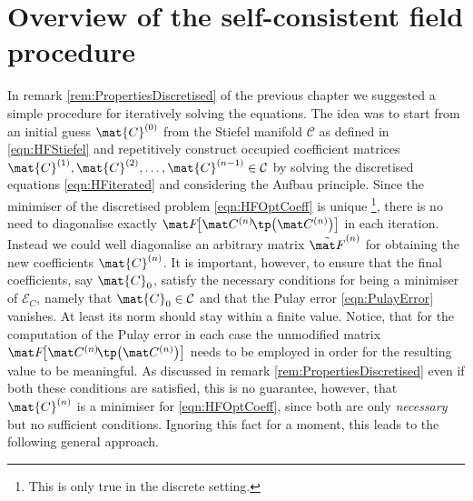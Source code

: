 \section{Overview of the self-consistent field procedure}
\label{sec:OverviewSCF}
In remark \ref{rem:PropertiesDiscretised}
of the previous chapter
we suggested a simple procedure for iteratively solving the \HF equations.
The idea was to start from an initial guess $\mat{C}^{(0)}$
from the Stiefel manifold $\mathcal{C}$ as defined in \eqref{eqn:HFStiefel}
and repetitively construct occupied coefficient
matrices $\mat{C}^{(1)}, \mat{C}^{(2)}, \ldots, \mat{C}^{(n-1)} \in \mathcal{C}$
by solving the discretised \HF equations \eqref{eqn:HFiterated}
and considering the Aufbau principle.
Since the minimiser
of the discretised \HF problem \eqref{eqn:HFOptCoeff}
is unique%
\footnote{This is only true in the discrete setting.},
there is no need to diagonalise exactly $\matFnfull$ in each iteration.
Instead we could well diagonalise an arbitrary matrix $\matFnt$
for obtaining the new coefficients $\mat{C}^{(n)}$.
It is important, however, to ensure that the final coefficients,
say $\mat{C}_0$,
satisfy the necessary conditions for being a minimiser of $\mathcal{E}_C$,
namely that $\mat{C}_0 \in \mathcal{C}$ and that the Pulay error \eqref{eqn:PulayError} vanishes.
At least its norm should stay within a finite value.
Notice, that for the computation of the Pulay error
in each case the unmodified matrix $\matFnfull$ needs to be employed
in order for the resulting value to be meaningful.
As discussed in remark \vref{rem:PropertiesDiscretised}
even if both these conditions are satisfied,
this is no guarantee, however,
that $\mat{C}^{(n)}$ is a minimiser for \eqref{eqn:HFOptCoeff},
since both are only \emph{necessary} but no sufficient conditions.
Ignoring this fact for a moment, this leads to the following general approach.

